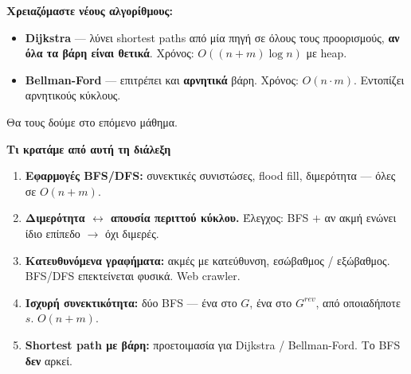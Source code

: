 \documentclass[11pt,a4paper]{article}
\begin{document}
\begin{keypoint}
\textbf{Χρειαζόμαστε νέους αλγορίθμους:}
\begin{itemize}
  \item \textbf{Dijkstra} --- λύνει shortest paths από μία πηγή σε όλους τους
  προορισμούς, \textbf{αν όλα τα βάρη είναι θετικά}. Χρόνος: $O((n + m) \log n)$
  με heap.
  \item \textbf{Bellman-Ford} --- επιτρέπει και \textbf{αρνητικά} βάρη. Χρόνος:
  $O(n \cdot m)$. Εντοπίζει αρνητικούς κύκλους.
\end{itemize}
Θα τους δούμε στο επόμενο μάθημα.
\end{keypoint}

\begin{recapbox}
\textbf{Τι κρατάμε από αυτή τη διάλεξη}
\begin{enumerate}
  \item \textbf{Εφαρμογές BFS/DFS:} συνεκτικές συνιστώσες, flood fill,
  διμερότητα --- όλες σε $O(n+m)$.
  \item \textbf{Διμερότητα $\leftrightarrow$ απουσία περιττού κύκλου.} Έλεγχος:
  BFS $+$ αν ακμή ενώνει ίδιο επίπεδο $\to$ όχι διμερές.
  \item \textbf{Κατευθυνόμενα γραφήματα:} ακμές με κατεύθυνση, εσώβαθμος /
  εξώβαθμος. BFS/DFS επεκτείνεται φυσικά. Web crawler.
  \item \textbf{Ισχυρή συνεκτικότητα:} δύο BFS --- ένα στο $G$, ένα στο
  $G^{rev}$, από οποιαδήποτε $s$. $O(n+m)$.
  \item \textbf{Shortest path με βάρη:} προετοιμασία για Dijkstra /
  Bellman-Ford. Το BFS \textbf{δεν} αρκεί.
\end{enumerate}
\end{recapbox}

\lecturefooter
\end{document}
